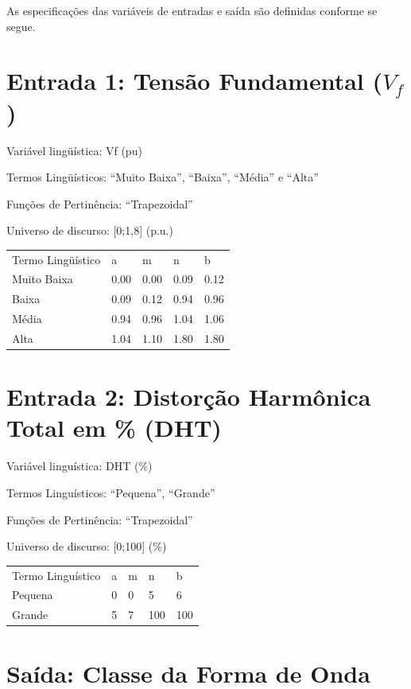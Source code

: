 \documentclass{report}
\begin{document}
As especificações das variáveis de entradas e saída são definidas conforme se segue.

\section{Entrada 1: Tensão Fundamental ($V_f$)}

Variável lingüística: Vf (pu)

Termos Lingüísticos: “Muito Baixa”, “Baixa”, “Média” e “Alta”

Funções de Pertinência: “Trapezoidal”

Universo de discurso: [0;1,8] (p.u.)


\begin{center}
\begin{tabular}{lllll}
Termo Lingüístico & a & m & n & b\\
Muito Baixa & 0.00 & 0.00 & 0.09 & 0.12\\
Baixa & 0.09 & 0.12 & 0.94 & 0.96\\
Média & 0.94 & 0.96 & 1.04 & 1.06\\
Alta & 1.04 & 1.10 & 1.80 & 1.80\\
\end{tabular}
\end{center}



\section{Entrada 2: Distorção Harmônica Total em \% (DHT)}

 Variável linguística: DHT (\%)

 Termos Linguísticos: “Pequena”, “Grande”

 Funções de Pertinência: “Trapezoidal”

 Universo de discurso: [0;100] (\%)


\begin{center}
\begin{tabular}{lllll}
Termo Linguístico & a & m & n & b\\
Pequena & 0 & 0 & 5 & 6\\
Grande & 5 & 7 & 100 & 100
\end{tabular}
\end{center}



\section{Saída: Classe da Forma de Onda}
\end{document}
